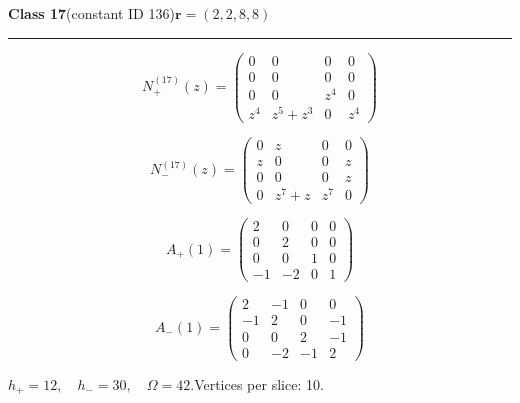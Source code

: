 \noindent\begin{minipage}{\linewidth}
\noindent\textbf{Class 17}\quad\small (constant ID 136)\hfill $\symbf{r}=(2,2,8,8)$
\par\smallskip\noindent\textcolor{rulegray}{\rule{\linewidth}{0.3pt}}
\begin{minipage}[c]{0.495\linewidth}\centering\fontsize{9.7}{12}\selectfont
\setlength{\abovedisplayskip}{4pt}\setlength{\belowdisplayskip}{4pt}
\setlength{\abovedisplayshortskip}{4pt}\setlength{\belowdisplayshortskip}{4pt}
\setlength{\arraycolsep}{3pt}\renewcommand{\arraystretch}{1.08}
\[N_{+}^{(17)}(z)=\begin{pmatrix}0 & 0 & 0 & 0\\0 & 0 & 0 & 0\\0 & 0 & z^{4} & 0\\z^{4} & z^{5} + z^{3} & 0 & z^{4}\end{pmatrix}\]
\end{minipage}%
\begin{minipage}[c]{0.495\linewidth}\centering\fontsize{9.7}{12}\selectfont
\setlength{\abovedisplayskip}{4pt}\setlength{\belowdisplayskip}{4pt}
\setlength{\abovedisplayshortskip}{4pt}\setlength{\belowdisplayshortskip}{4pt}
\setlength{\arraycolsep}{3pt}\renewcommand{\arraystretch}{1.08}
\[N_{-}^{(17)}(z)=\begin{pmatrix}0 & z & 0 & 0\\z & 0 & 0 & z\\0 & 0 & 0 & z\\0 & z^{7} + z & z^{7} & 0\end{pmatrix}\]
\end{minipage}%
\par\noindent
\begin{minipage}[c]{0.495\linewidth}\centering\fontsize{9.7}{12}\selectfont
\setlength{\abovedisplayskip}{4pt}\setlength{\belowdisplayskip}{4pt}
\setlength{\abovedisplayshortskip}{4pt}\setlength{\belowdisplayshortskip}{4pt}
\setlength{\arraycolsep}{3pt}\renewcommand{\arraystretch}{1.08}
\[A_{+}(1)=\begin{pmatrix}2 & 0 & 0 & 0\\0 & 2 & 0 & 0\\0 & 0 & 1 & 0\\-1 & -2 & 0 & 1\end{pmatrix}\]
\end{minipage}%
\begin{minipage}[c]{0.495\linewidth}\centering\fontsize{9.7}{12}\selectfont
\setlength{\abovedisplayskip}{4pt}\setlength{\belowdisplayskip}{4pt}
\setlength{\abovedisplayshortskip}{4pt}\setlength{\belowdisplayshortskip}{4pt}
\setlength{\arraycolsep}{3pt}\renewcommand{\arraystretch}{1.08}
\[A_{-}(1)=\begin{pmatrix}2 & -1 & 0 & 0\\-1 & 2 & 0 & -1\\0 & 0 & 2 & -1\\0 & -2 & -1 & 2\end{pmatrix}\]
\end{minipage}%
\par\smallskip\noindent\small $h_+=12,\quad h_-=30,\quad \Omega=42.$\quad Vertices per slice: 10.
\end{minipage}\par\vfill
\clearpage
